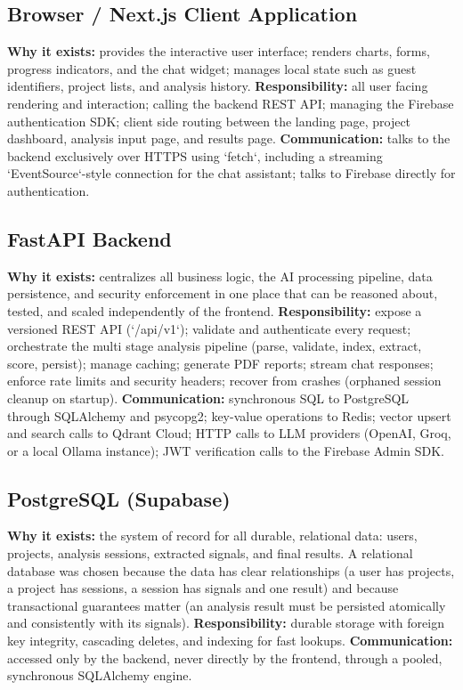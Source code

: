 \documentclass[11pt,a4paper]{report}
\begin{document}
\subsection{Browser / Next.js Client Application}
\textbf{Why it exists:} provides the interactive user interface; renders charts, forms, progress indicators, and the chat widget; manages local state such as guest identifiers, project lists, and analysis history.
\textbf{Responsibility:} all user facing rendering and interaction; calling the backend REST API; managing the Firebase authentication SDK; client side routing between the landing page, project dashboard, analysis input page, and results page.
\textbf{Communication:} talks to the backend exclusively over HTTPS using `fetch`, including a streaming `EventSource`-style connection for the chat assistant; talks to Firebase directly for authentication.

\subsection{FastAPI Backend}
\textbf{Why it exists:} centralizes all business logic, the AI processing pipeline, data persistence, and security enforcement in one place that can be reasoned about, tested, and scaled independently of the frontend.
\textbf{Responsibility:} expose a versioned REST API (`/api/v1`); validate and authenticate every request; orchestrate the multi stage analysis pipeline (parse, validate, index, extract, score, persist); manage caching; generate PDF reports; stream chat responses; enforce rate limits and security headers; recover from crashes (orphaned session cleanup on startup).
\textbf{Communication:} synchronous SQL to PostgreSQL through SQLAlchemy and psycopg2; key-value operations to Redis; vector upsert and search calls to Qdrant Cloud; HTTP calls to LLM providers (OpenAI, Groq, or a local Ollama instance); JWT verification calls to the Firebase Admin SDK.

\subsection{PostgreSQL (Supabase)}
\textbf{Why it exists:} the system of record for all durable, relational data: users, projects, analysis sessions, extracted signals, and final results. A relational database was chosen because the data has clear relationships (a user has projects, a project has sessions, a session has signals and one result) and because transactional guarantees matter (an analysis result must be persisted atomically and consistently with its signals).
\textbf{Responsibility:} durable storage with foreign key integrity, cascading deletes, and indexing for fast lookups.
\textbf{Communication:} accessed only by the backend, never directly by the frontend, through a pooled, synchronous SQLAlchemy engine.
\end{document}
